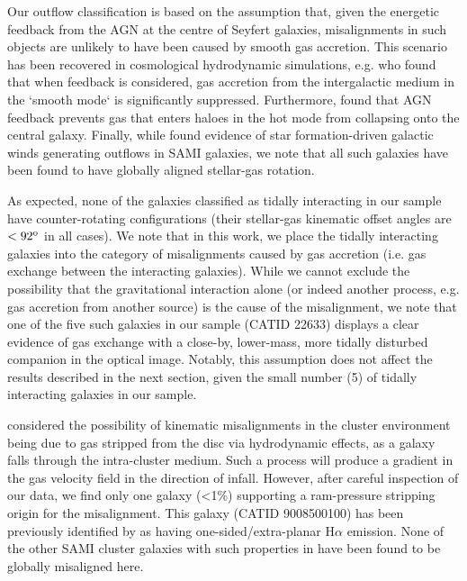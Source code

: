 \documentclass[fleqn,usenatbib]{mnras}
\begin{document}
Our outflow classification is based on the assumption that, given the energetic feedback from the AGN at the centre of Seyfert galaxies, misalignments in such objects are unlikely to have been caused by smooth gas accretion. This scenario has been recovered in cosmological hydrodynamic simulations, e.g. \cite{Nelson2015} who found that when feedback is considered, gas accretion from the intergalactic medium in the `smooth mode` is significantly suppressed. Furthermore, \cite{Vandevoort2011} found that AGN feedback prevents gas that enters haloes in the hot mode from collapsing onto the central galaxy. Finally, while \citet{Ho2016b} found evidence of star formation-driven galactic winds generating outflows in SAMI galaxies, we note that all such galaxies have been found to have globally aligned stellar-gas rotation. 

As expected, none of the galaxies classified as tidally interacting in our sample have counter-rotating configurations (their stellar-gas kinematic offset angles are $<92^{\rm{o}}$ in all cases). We note that in this work, we place the tidally interacting galaxies into the category of misalignments caused by gas accretion (i.e. gas exchange between the interacting galaxies). While we cannot exclude the possibility that the gravitational interaction alone (or indeed another process, e.g. gas accretion from another source) is the cause of the misalignment, we note that one of the five such galaxies in our sample (CATID 22633) displays a clear evidence of gas exchange with a close-by, lower-mass, more tidally disturbed companion in the optical image. Notably, this assumption does not affect the results described in the next section, given the small number (5) of tidally interacting galaxies in our sample. 

\cite{Bryant2019} considered the possibility of kinematic misalignments in the cluster environment being  due to gas stripped from the disc via hydrodynamic effects, as a galaxy falls through the intra-cluster medium. Such a process will produce a gradient in the gas velocity field in the direction of infall. However, after careful inspection of our data, we find only one galaxy (<1\%) supporting a ram-pressure stripping origin for the misalignment. This galaxy (CATID 9008500100) has been previously identified by \cite{Owers2019} as having one-sided/extra-planar H$\alpha$ emission. None of the other SAMI cluster galaxies with such properties in \cite{Owers2019} have been found to be globally misaligned here.
\end{document}
